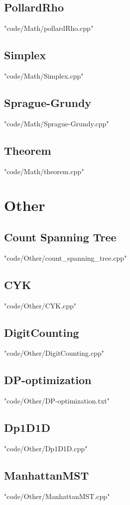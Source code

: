 \subsection{PollardRho}
 {"code/Math/pollardRho.cpp"}
\subsection{Simplex}
 {"code/Math/Simplex.cpp"}
\subsection{Sprague-Grundy}
 {"code/Math/Sprague-Grundy.cpp"}
\subsection{Theorem}
 {"code/Math/theorem.cpp"}
\section{Other}
\subsection{Count Spanning Tree}
 {"code/Other/count_spanning_tree.cpp"}
\subsection{CYK}
 {"code/Other/CYK.cpp"}
\subsection{DigitCounting}
 {"code/Other/DigitCounting.cpp"}
\subsection{DP-optimization}
 {"code/Other/DP-optimization.txt"}
\subsection{Dp1D1D}
 {"code/Other/Dp1D1D.cpp"}
\subsection{ManhattanMST}
 {"code/Other/ManhattanMST.cpp"}
